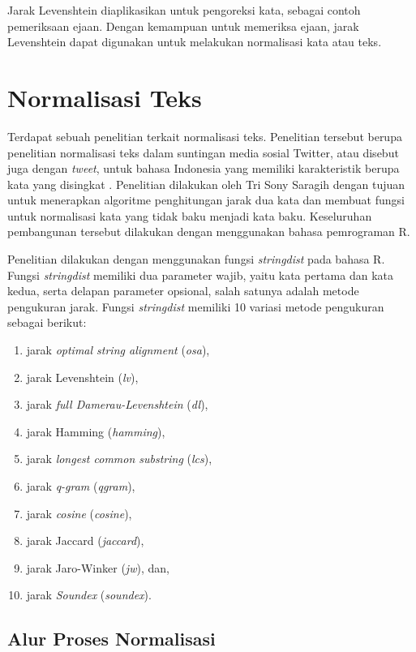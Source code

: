 Jarak Levenshtein diaplikasikan untuk pengoreksi kata, sebagai contoh pemeriksaan ejaan. Dengan kemampuan untuk memeriksa ejaan, jarak Levenshtein dapat digunakan untuk melakukan normalisasi kata atau teks.

\section{Normalisasi Teks}

Terdapat sebuah penelitian terkait normalisasi teks. Penelitian tersebut berupa penelitian normalisasi teks dalam suntingan media sosial Twitter, atau disebut juga dengan \textit{tweet}, untuk bahasa Indonesia yang memiliki karakteristik berupa kata yang disingkat \parencite{saragih2017normalisasi}. Penelitian dilakukan oleh Tri Sony Saragih dengan tujuan untuk menerapkan algoritme penghitungan jarak dua kata dan membuat fungsi untuk normalisasi kata yang tidak baku menjadi kata baku. Keseluruhan pembangunan tersebut dilakukan dengan menggunakan bahasa pemrograman R.

Penelitian dilakukan dengan menggunakan fungsi \textit{stringdist} pada bahasa R. Fungsi \textit{stringdist} memiliki dua parameter wajib, yaitu kata pertama dan kata kedua, serta delapan parameter opsional, salah satunya adalah metode pengukuran jarak. Fungsi \textit{stringdist} memiliki 10 variasi metode pengukuran sebagai berikut:

\begin{enumerate}
	\item jarak \textit{optimal string alignment} (\textit{osa}),
	\item jarak Levenshtein (\textit{lv}),
	\item jarak \textit{full Damerau-Levenshtein} (\textit{dl}),
	\item jarak Hamming (\textit{hamming}),
	\item jarak \textit{longest common substring} (\textit{lcs}),
	\item jarak \textit{q-gram} (\textit{qgram}),
	\item jarak \textit{cosine} (\textit{cosine}),
	\item jarak Jaccard (\textit{jaccard}),
	\item jarak Jaro-Winker (\textit{jw}), dan,
	\item jarak \textit{Soundex} (\textit{soundex}).
\end{enumerate}

\subsection{Alur Proses Normalisasi}

